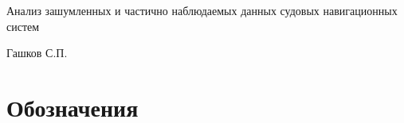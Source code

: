 \documentclass[a4paper,12pt]{report}
\begin{document}
	
	\thispagestyle{empty}
	{ \large
		\begin{center}
			\renewcommand{\baselinestretch}{1.2}
			\Large
			{\Large Анализ зашумленных и частично наблюдаемых данных судовых навигационных систем}
		\end{center}
		\medskip%
		
		\vspace{3\bigskipamount}%
		\begin{flushright}
			\begin{minipage}{0.5\textwidth}
				\begin{flushleft}
					Гашков С.П.
				\end{flushleft}
			\end{minipage}
		\end{flushright}
		
		\vfill%
	}
	
	
	\large
	
	\onehalfspacing
	
	\clearpage
	\renewcommand{\thesection}{\arabic{section}}
	\graphicspath{{../pict/}}
	
	\tableofcontents
	\newpage

	\section{Обозначения}
\end{document}
